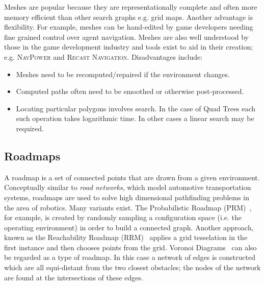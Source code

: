 Meshes are popular because they are representationally complete and often more
memory efficient than other search graphs e.g. grid maps. Another advantage is
flexibility. For example, meshes can be hand-edited by game developers needing
fine grained control over agent navigation. Meshes are also well understood by 
those in the game development industry and tools exist to aid in their creation; 
e.g. \textsc{NavPower} and \textsc{Recast Navigation}. Disadvantages include: 
\begin{itemize}
\item Meshes need to be recomputed/repaired if the environment changes.
\item Computed paths often need to be smoothed or otherwise post-processed.
\item Locating particular polygons involves search. In the case 
of Quad Trees each such operation takes logarithmic time. In other cases
a linear search may be required.
\end{itemize}


\subsection{Roadmaps}
\label{cha::lit::graphs::road}
A roadmap is a set of connected points that are drawn from a given environment.
Conceptually similar to \emph{road networks}, which model automotive
transportation systems, roadmaps are used to solve high dimensional pathfinding
problems in the area of robotics.  Many variants exist. The Probabilistic
Roadmap (PRM)~\citep{kavraki94}, for example,
 is created by randomly sampling a configuration space (i.e. the operating environment) in
order to build a connected graph. Another approach, known as the Reachability
Roadmap (RRM)~\citep{geraerts05} applies a grid tesselation in the first
instance and then chooses points from the grid.  Voronoi Diagrams~\citep{aurenhammer91}
can also be regarded as a type of roadmap. In this case a network of edges is constructed
which are all equi-distant from the two closest obstacles; the nodes of the network are 
found at the intersections of these edges.

